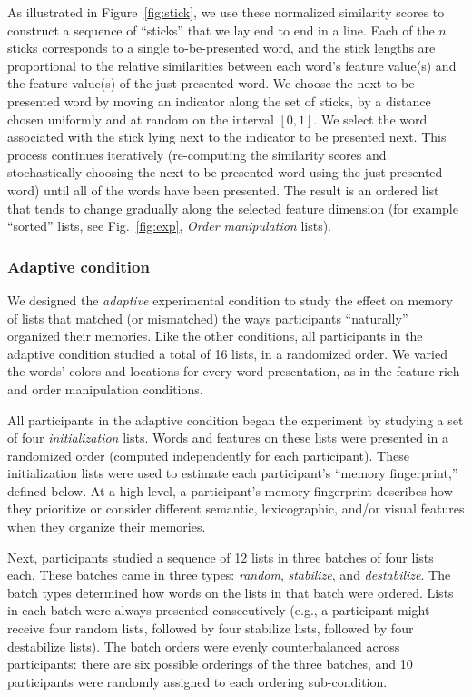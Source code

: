 \documentclass[11pt]{article}
\begin{document}
As illustrated in Figure~\ref{fig:stick}, we use these normalized similarity
scores to construct a sequence of ``sticks'' that we lay end to end in a line.
Each of the $n$ sticks corresponds to a single to-be-presented word, and the
stick lengths are proportional to the relative similarities between each word's
feature value(s) and the feature value(s) of the just-presented word. We choose
the next to-be-presented word by moving an indicator along the set of sticks,
by a distance chosen uniformly and at random on the interval $\left[0,
1\right]$. We select the word associated with the stick lying next to the
indicator to be presented next. This process continues iteratively
(re-computing the similarity scores and stochastically choosing the next
to-be-presented word using the just-presented word) until all of the words have
been presented. The result is an ordered list that tends to change gradually
along the selected feature dimension (for example ``sorted'' lists, see
Fig.~\ref{fig:exp}, \textit{Order manipulation} lists).

\subsubsection*{Adaptive condition}

We designed the \textit{adaptive} experimental condition to study the effect on
memory of lists that matched (or mismatched) the ways participants
``naturally'' organized their memories. Like the other conditions, all
participants in the adaptive condition studied a total of 16 lists, in a
randomized order. We varied the words' colors and locations for every word
presentation, as in the feature-rich and order manipulation conditions.

All participants in the adaptive condition began the experiment by studying a
set of four \textit{initialization} lists. Words and features on these lists
were presented in a randomized order (computed independently for each
participant). These initialization lists were used to estimate each
participant's ``memory fingerprint,'' defined below. At a high level, a
participant's memory fingerprint describes how they prioritize or consider
different semantic, lexicographic, and/or visual features when they organize
their memories.

Next, participants studied a sequence of 12 lists in three batches of four
lists each. These batches came in three types: \textit{random},
\textit{stabilize}, and \textit{destabilize}. The batch types determined how
words on the lists in that batch were ordered. Lists in each batch were always
presented consecutively (e.g., a participant might receive four random lists,
followed by four stabilize lists, followed by four destabilize lists). The
batch orders were evenly counterbalanced across participants: there are six
possible orderings of the three batches, and 10 participants were randomly
assigned to each ordering sub-condition.
\end{document}
